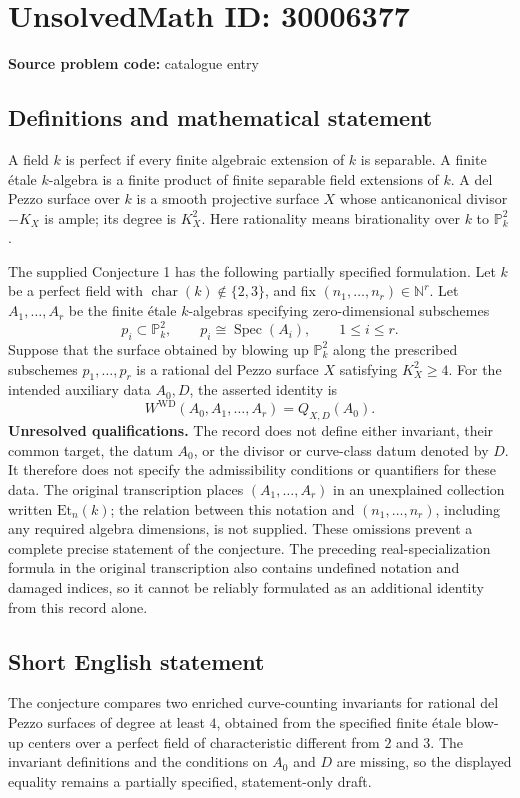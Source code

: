 \documentclass[11pt]{article}
\newcommand{\N}{\mathbb{N}}
\begin{document}
\section*{UnsolvedMath ID: 30006377}
\textbf{Source problem code:} catalogue entry
\subsection{Definitions and mathematical statement}
A field \(k\) is perfect if every finite algebraic extension of \(k\) is separable. A finite étale \(k\)-algebra is a finite product of finite separable field extensions of \(k\). A del Pezzo surface over \(k\) is a smooth projective surface \(X\) whose anticanonical divisor \(-K_X\) is ample; its degree is \(K_X^2\). Here rationality means birationality over \(k\) to \(\mathbb{P}^2_k\).

The supplied Conjecture 1 has the following partially specified formulation. Let \(k\) be a perfect field with \(\operatorname{char}(k)\notin\{2,3\}\), and fix \((n_1,\ldots,n_r)\in\N^r\). Let \(A_1,\ldots,A_r\) be the finite étale \(k\)-algebras specifying zero-dimensional subschemes
\[
 p_i\subset\mathbb{P}^2_k,\qquad p_i\cong\operatorname{Spec}(A_i),\qquad 1\leq i\leq r.
\]
Suppose that the surface obtained by blowing up \(\mathbb{P}^2_k\) along the prescribed subschemes \(p_1,\ldots,p_r\) is a rational del Pezzo surface \(X\) satisfying \(K_X^2\geq4\). For the intended auxiliary data \(A_0,D\), the asserted identity is
\[
 W^{\mathrm{WD}}(A_0,A_1,\ldots,A_r)=Q_{X,D}(A_0).
\]
\textbf{Unresolved qualifications.} The record does not define either invariant, their common target, the datum \(A_0\), or the divisor or curve-class datum denoted by \(D\). It therefore does not specify the admissibility conditions or quantifiers for these data. The original transcription places \((A_1,\ldots,A_r)\) in an unexplained collection written \(\mathrm{Et}_{n}(k)\); the relation between this notation and \((n_1,\ldots,n_r)\), including any required algebra dimensions, is not supplied. These omissions prevent a complete precise statement of the conjecture. The preceding real-specialization formula in the original transcription also contains undefined notation and damaged indices, so it cannot be reliably formulated as an additional identity from this record alone.
\subsection{Short English statement}
The conjecture compares two enriched curve-counting invariants for rational del Pezzo surfaces of degree at least \(4\), obtained from the specified finite étale blow-up centers over a perfect field of characteristic different from \(2\) and \(3\). The invariant definitions and the conditions on \(A_0\) and \(D\) are missing, so the displayed equality remains a partially specified, statement-only draft.
\end{document}
